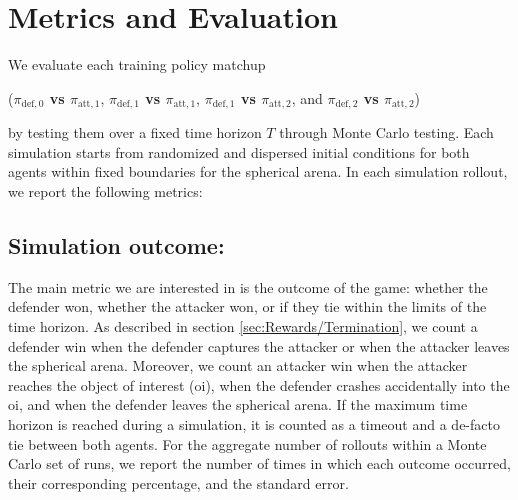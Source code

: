 \section{Metrics and Evaluation}
\label{sec:metrics-and-evaluation}

We evaluate each training policy matchup 

({\boldmath\textbf{$\pi_{\mathrm{def},0}$ vs $\pi_{\mathrm{att},1}$}}, {\boldmath\textbf{$\pi_{\mathrm{def},1}$ vs $\pi_{\mathrm{att},1}$}}, {\boldmath\textbf{$\pi_{\mathrm{def},1}$ vs $\pi_{\mathrm{att},2}$}}, and {\boldmath\textbf{$\pi_{\mathrm{def},2}$ vs $\pi_{\mathrm{att},2}$}})


by testing them over a fixed time horizon \(T\) through Monte Carlo testing. Each simulation starts from randomized and dispersed initial conditions for both agents within fixed boundaries for the spherical arena. In each simulation rollout, we report the following metrics:


\subsection*{Simulation outcome:}

The main metric we are interested in is the outcome of the game: whether the defender won, whether the attacker won, or if they tie within the limits of the time horizon. As described in section \ref{sec:Rewards/Termination}, we count a defender win when the defender captures the attacker or when the attacker leaves the spherical arena. Moreover, we count an attacker win when the attacker reaches the object of interest (\acs{oi}), when the defender crashes accidentally into the \acs{oi}, and when the defender leaves the spherical arena. If the maximum time horizon is reached during a simulation, it is counted as a timeout and a de-facto tie between both agents. For the aggregate number of rollouts within a Monte Carlo set of runs, we report the number of times in which each outcome occurred, their corresponding percentage, and the standard error.




